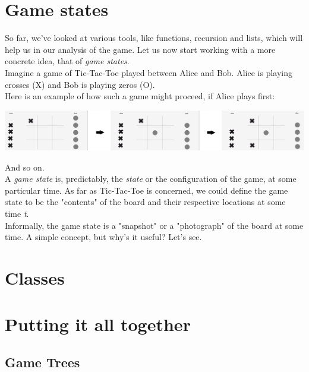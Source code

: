 \documentclass{article}
\begin{document}
\section{Game states} 

So far, we've looked at various tools, like functions, recursion and lists,
which will help us in our analysis of the game. Let us now start working with
a more concrete idea, that of \textit{game states}. \\

\noindent Imagine a game of Tic-Tac-Toe played between Alice and Bob. Alice is playing crosses (X) and Bob is playing zeros (O). \\

\noindent Here is an example of how such a game might proceed, if Alice plays first:

\begin{center}
    \includegraphics[scale=0.11]{AliceVBob}
\end{center}

\noindent And so on. \\

\noindent A \textit{game state} is, predictably, the \textit{state} or the configuration of the game, at some particular time. As far as Tic-Tac-Toe is concerned, we could define the game state to be the "contents" of the board and their respective locations at some time \textit{t}. \\

\noindent Informally, the game state is a "snapshot" or a "photograph" of the board at some time. A simple concept, but why's it useful? Let's see. 

\section{Classes}

\section{Putting it all together}

\subsection{Game Trees}
\end{document}
